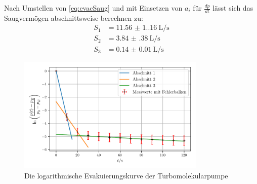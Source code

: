    Nach Umstellen von \autoref{eq:evacSaug} und mit Einsetzen von $a_i$ für $\frac{dp}{dt}$
    lässt sich das Saugvermögen abschnittsweise berechnen zu:
    \begin{align*}
        S_1 &= \qty{11.56(1.16)}{\liter\per\second} \\
        S_2 &= \qty{3.84(38)}{\liter\per\second} \\
        S_3 &= \qty{0.14(1)}{\liter\per\second} 
    \end{align*}

    \begin{figure}
        \centering
        \includegraphics[width=0.8\textwidth]{abb/turbo_evac.pdf}
        \caption{Die logarithmische Evakuierungskurve der Turbomolekularpumpe}
        \label{fig:turboEvac}
    \end{figure}

